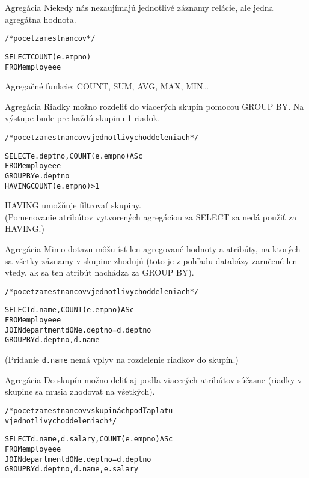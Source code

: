 \documentclass[12pt]{beamer}
\def\blue#1{\textcolor{Cerulean}{#1}}
\begin{document}
\begin{frame}[fragile]{Agregácia}
Niekedy nás nezaujímajú jednotlivé záznamy relácie, ale jedna agregátna hodnota.
\begin{alltt}
/* pocet zamestnancov */

SELECT \alert{COUNT}(e.empno)
FROM employee e
\end{alltt}
Agregačné funkcie: COUNT, SUM, AVG, MAX, MIN\dots
\end{frame}

\begin{frame}[fragile]{Agregácia}
Riadky možno rozdeliť do viacerých skupín pomocou GROUP BY. Na výstupe bude pre každú skupinu 1 riadok.
\begin{alltt}
/* pocet zamestnancov v jednotlivych oddeleniach */

SELECT e.deptno, \alert{COUNT}(e.empno) AS c
FROM employee e
\alert{GROUP BY} e.deptno
\blue{HAVING} COUNT(e.empno) > 1
\end{alltt}
\bigskip
HAVING umožňuje filtrovať skupiny.\\
(Pomenovanie atribútov vytvorených agregáciou za SELECT sa nedá použiť za HAVING.)
\end{frame}

\begin{frame}[fragile]{Agregácia}
Mimo dotazu môžu ísť len agregované hodnoty a atribúty, na ktorých sa všetky záznamy v skupine zhodujú
(toto je z pohľadu databázy zaručené len vtedy, ak sa ten atribút nachádza za GROUP BY).
\begin{alltt}
/* pocet zamestnancov v jednotlivych oddeleniach */

SELECT \blue{d.name}, \alert{COUNT}(e.empno) AS c
FROM employee e
    JOIN department d ON e.deptno = d.deptno
\alert{GROUP BY} d.deptno, \blue{d.name}
\end{alltt}
(Pridanie \verb|d.name| nemá vplyv na rozdelenie riadkov do skupín.)
\end{frame}

\begin{frame}[fragile]{Agregácia}
Do skupín možno deliť aj podľa viacerých atribútov súčasne (riadky v skupine sa musia zhodovať na všetkých).
\begin{alltt}
/* pocet zamestnancov v skupinách podľa platu
v jednotlivych oddeleniach */

SELECT d.name, d.salary, \alert{COUNT}(e.empno) AS c
FROM employee e
    JOIN department d ON e.deptno = d.deptno
\alert{GROUP BY} d.deptno, d.name, e.salary
\end{alltt}
\end{frame}
\end{document}
